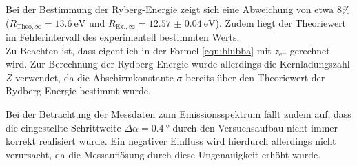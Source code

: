 Bei der Bestimmung der Ryberg-Energie zeigt sich eine Abweichung von etwa $8\%$ ($R_{\mathrm{Theo},\infty}=\SI{13.6}{\electronvolt}$ und $R_{\mathrm{Ex.},\infty}=\SI{12.57(4)}{\electronvolt}$). Zudem liegt der Theoriewert im Fehlerintervall des experimentell bestimmten Werts.\\
Zu Beachten ist, dass eigentlich in der Formel \eqref{eqn:blubba} mit $z_\mathrm{eff}$ gerechnet wird. Zur Berechnung der Rydberg-Energie wurde allerdings die Kernladungszahl $Z$ verwendet, da die Abschirmkonstante $\sigma$ bereits über den Theoriewert der Rydberg-Energie bestimmt wurde.

Bei der Betrachtung der Messdaten zum Emissionsspektrum fällt zudem auf, dass die eingestellte Schrittweite $\Delta \alpha=\SI{0.4}{\degree}$ durch den Versuchsaufbau nicht immer korrekt realisiert wurde. Ein negativer Einfluss wird hierdurch allerdings nicht verursacht, da die Messauflösung durch diese Ungenauigkeit erhöht wurde.
